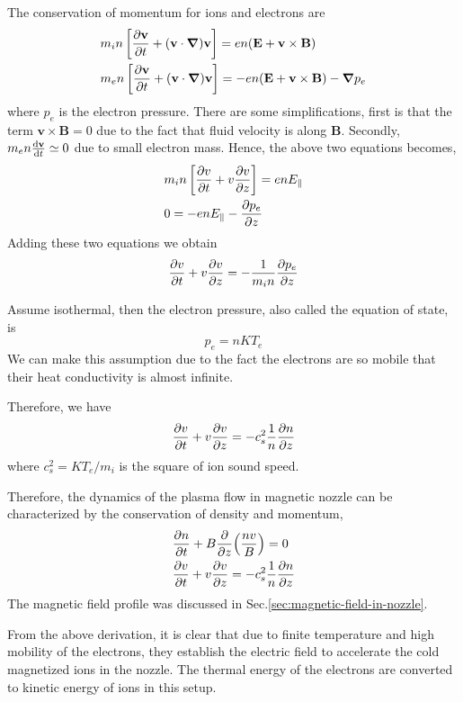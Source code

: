 The conservation of momentum for ions and electrons are
\begin{align}
	 & m_in\left[\pdv{\mathbf{v}}{t} + (\mathbf{v}\cdot\grad)\mathbf{v}\right] = en(\mathbf{E}+\mathbf{v}\times\mathbf{B})                \\
	 & m_en\left[\pdv{\mathbf{v}}{t} + (\mathbf{v}\cdot\grad)\mathbf{v}\right]  = -en(\mathbf{E}+\mathbf{v}\times\mathbf{B}) - \grad{p_e}
\end{align}
where $p_e$ is the electron pressure. There are some simplifications, first is that the term $\mathbf{v\times B} = 0$ due to the fact that fluid velocity is along $\mathbf{B}$. Secondly, $m_en\dv{\mathbf{v}}{t} \simeq 0$ due to small electron mass. Hence, the above two equations becomes,
\begin{align}
	 & m_in\left[\pdv{v}{t} + v\pdv{v}{z}\right] = enE_\parallel \\
	 & 0 = -enE_\parallel - \pdv{p_e}{z}
\end{align}
Adding these two equations we obtain
\begin{equation}
	\pdv{v}{t} + v\pdv{v}{z} = -\frac{1}{m_in}\pdv{p_e}{z}
\end{equation}

Assume isothermal, then the electron pressure, also called the equation of state, is
\begin{equation} \label{eq:eos}
	p_e = nKT_e
\end{equation}
We can make this assumption due to the fact the electrons are so mobile that their heat conductivity is almost infinite. \cite{chen_introduction_2016}

Therefore, we have
\begin{equation}
	\pdv{v}{t} + v\pdv{v}{z} = -c_s^2\frac{1}{n}\pdv{n}{z}
\end{equation}
where $c_s^2 = KT_e/m_i$ is the square of ion sound speed.

Therefore, the dynamics of the plasma flow in magnetic nozzle can be characterized by the conservation of density and momentum,
\begin{align*}
	 & \pdv{n}{t} + B\pdv{z}(\frac{nv}{B}) = 0                \\
	 & \pdv{v}{t} + v\pdv{v}{z} = -c_s^2\frac{1}{n}\pdv{n}{z}
\end{align*}
The magnetic field profile was discussed in Sec.\ref{sec:magnetic-field-in-nozzle}.

From the above derivation, it is clear that due to finite temperature and high mobility of the electrons, they establish the electric field to accelerate the cold magnetized ions in the nozzle. The thermal energy of the electrons are converted to kinetic energy of ions in this setup.

